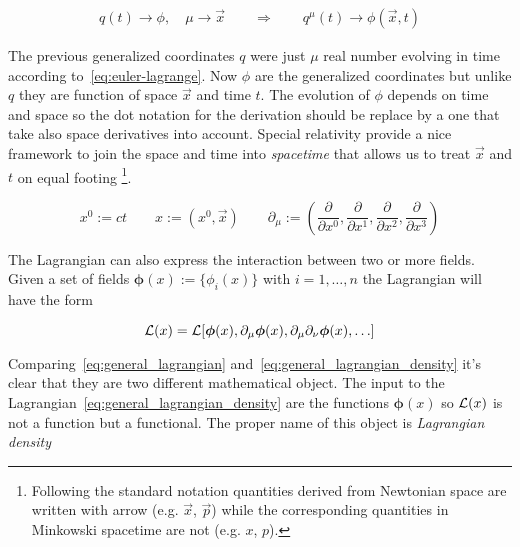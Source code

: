 \begin{align*}
  q(t) \rightarrow \phi, \quad \mu \rightarrow \vec{x}
  \qquad \Rightarrow \qquad
  q^{\mu}(t) \rightarrow \phi(\vec{x},t)
\end{align*}

The previous generalized coordinates $q$ were just $\mu$ real number evolving in
time according to~\eqref{eq:euler-lagrange}. Now $\phi$ are the generalized
coordinates but unlike $q$ they are function of space $\vec{x}$ and time $t$.
The evolution of $\phi$ depends on time and space so the dot notation for the
derivation should be replace by a one that take also space derivatives
into account. Special relativity provide a nice framework to join the space and
time into \emph{spacetime} that allows us to treat $\vec{x}$ and $t$ on equal
footing
\footnote{
  Following the standard notation quantities derived from Newtonian space are
  written with arrow (e.g. $\vec{x}$, $\vec{p}$) while the corresponding
  quantities in Minkowski spacetime are not (e.g. $x$, $p$).
}.

\begin{equation*}
  x^0 := ct \qquad
  x := (x^0, \vec{x}) \qquad
  \partial_{\mu} := \left(
    \frac{\partial}{\partial x^0},
    \frac{\partial}{\partial x^1},
    \frac{\partial}{\partial x^2},
    \frac{\partial}{\partial x^3}
  \right)
\end{equation*}

The Lagrangian can also express the interaction between two or more fields.
Given a set of fields $\bm{\phi}(x):=\{\phi_i(x)\}$ with $i=1,\ldots,n$ the
Lagrangian will have the form

\begin{equation} \label{eq:general_lagrangian_density}
  \operatorname{\mathcal{L}}(x) = \operatorname{\mathcal{L}}[
      \bm{\phi}(x),
      \partial_{\mu} \bm{\phi}(x),
      \partial_{\mu} \partial_{\nu} \bm{\phi}(x),
      \ldots
    ]
\end{equation}

Comparing~\eqref{eq:general_lagrangian}
and~\eqref{eq:general_lagrangian_density} it's clear that they are two different
mathematical object. The input to the
Lagrangian~\eqref{eq:general_lagrangian_density} are the functions
$\bm{\phi}(x)$ so $\operatorname{\mathcal{L}}(x)$ is not a function but a functional. The proper name
of this object is \emph{Lagrangian density}



